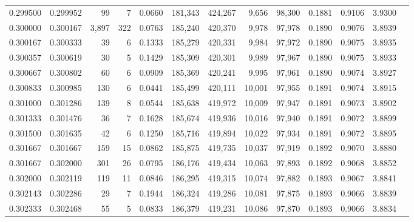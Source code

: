 \begin{tabular}{rrrrrrrrrrrrr}
0.299500 & 0.299952 &    99 &   7 &                                     0.0660 & 181,343 & 424,267 &   9,656 &  98,300 & 0.1881 & 0.9106 & 3.9300 \\
0.300000 & 0.300167 & 3,897 & 322 &                                     0.0763 & 185,240 & 420,370 &   9,978 &  97,978 & 0.1890 & 0.9076 & 3.8939 \\
0.300167 & 0.300333 &    39 &   6 &                                     0.1333 & 185,279 & 420,331 &   9,984 &  97,972 & 0.1890 & 0.9075 & 3.8935 \\
0.300357 & 0.300619 &    30 &   5 &                                     0.1429 & 185,309 & 420,301 &   9,989 &  97,967 & 0.1890 & 0.9075 & 3.8933 \\
0.300667 & 0.300802 &    60 &   6 &                                     0.0909 & 185,369 & 420,241 &   9,995 &  97,961 & 0.1890 & 0.9074 & 3.8927 \\
0.300833 & 0.300985 &   130 &   6 &                                     0.0441 & 185,499 & 420,111 &  10,001 &  97,955 & 0.1891 & 0.9074 & 3.8915 \\
0.301000 & 0.301286 &   139 &   8 &                                     0.0544 & 185,638 & 419,972 &  10,009 &  97,947 & 0.1891 & 0.9073 & 3.8902 \\
0.301333 & 0.301476 &    36 &   7 &                                     0.1628 & 185,674 & 419,936 &  10,016 &  97,940 & 0.1891 & 0.9072 & 3.8899 \\
0.301500 & 0.301635 &    42 &   6 &                                     0.1250 & 185,716 & 419,894 &  10,022 &  97,934 & 0.1891 & 0.9072 & 3.8895 \\
0.301667 & 0.301667 &   159 &  15 &                                     0.0862 & 185,875 & 419,735 &  10,037 &  97,919 & 0.1892 & 0.9070 & 3.8880 \\
0.301667 & 0.302000 &   301 &  26 &                                     0.0795 & 186,176 & 419,434 &  10,063 &  97,893 & 0.1892 & 0.9068 & 3.8852 \\
0.302000 & 0.302119 &   119 &  11 &                                     0.0846 & 186,295 & 419,315 &  10,074 &  97,882 & 0.1893 & 0.9067 & 3.8841 \\
0.302143 & 0.302286 &    29 &   7 &                                     0.1944 & 186,324 & 419,286 &  10,081 &  97,875 & 0.1893 & 0.9066 & 3.8839 \\
0.302333 & 0.302468 &    55 &   5 &                                     0.0833 & 186,379 & 419,231 &  10,086 &  97,870 & 0.1893 & 0.9066 & 3.8834 \\

\end{tabular}

